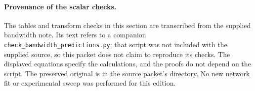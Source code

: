 \documentclass[11pt]{article}
\theoremstyle{definition}\newtheorem{definition}[theorem]{Definition}
\theoremstyle{remark}\newtheorem{remark}[theorem]{Remark}
\numberwithin{equation}{section}
\begin{document}
\paragraph{Provenance of the scalar checks.}
\begingroup\raggedright
The tables and transform checks in this section are transcribed from the supplied bandwidth note. Its text refers to a companion \texttt{check\_bandwidth\_predictions.py}; that script was not included with the supplied source, so this packet does not claim to reproduce its checks. The displayed equations specify the calculations, and the proofs do not depend on the script. The preserved original is  in the source packet's  directory. No new network fit or experimental sweep was performed for this edition.
\par\endgroup
\end{document}
